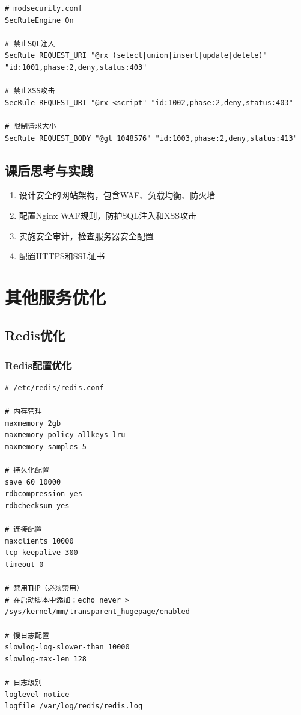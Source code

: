 \documentclass[12pt,UTF8]{ctexbook}
\begin{document}
\begin{lstlisting}
# modsecurity.conf
SecRuleEngine On

# 禁止SQL注入
SecRule REQUEST_URI "@rx (select|union|insert|update|delete)" "id:1001,phase:2,deny,status:403"

# 禁止XSS攻击
SecRule REQUEST_URI "@rx <script" "id:1002,phase:2,deny,status:403"

# 限制请求大小
SecRule REQUEST_BODY "@gt 1048576" "id:1003,phase:2,deny,status:413"
\end{lstlisting}

\section{课后思考与实践}
\label{sec:security-optimization-practice}
\begin{enumerate}
    \item 设计安全的网站架构，包含WAF、负载均衡、防火墙
    \item 配置Nginx WAF规则，防护SQL注入和XSS攻击
    \item 实施安全审计，检查服务器安全配置
    \item 配置HTTPS和SSL证书
\end{enumerate}

\chapter{其他服务优化}
\label{chap:other-tuning}

\section{Redis优化}
\label{sec:redis-tuning}

\subsection*{Redis配置优化}

\begin{lstlisting}
# /etc/redis/redis.conf

# 内存管理
maxmemory 2gb
maxmemory-policy allkeys-lru
maxmemory-samples 5

# 持久化配置
save 60 10000
rdbcompression yes
rdbchecksum yes

# 连接配置
maxclients 10000
tcp-keepalive 300
timeout 0

# 禁用THP（必须禁用）
# 在启动脚本中添加：echo never > /sys/kernel/mm/transparent_hugepage/enabled

# 慢日志配置
slowlog-log-slower-than 10000
slowlog-max-len 128

# 日志级别
loglevel notice
logfile /var/log/redis/redis.log
\end{lstlisting}
\end{document}

